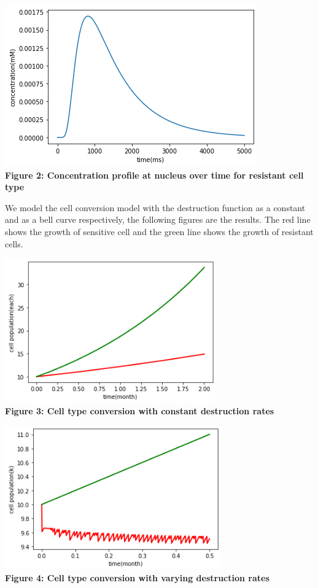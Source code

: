 \documentclass{edm_article}
\begin{document}
\includegraphics[scale = 0.6]{resistant.png}\\
\textbf{Figure 2: Concentration profile at nucleus over time for resistant cell type}

We model the cell conversion model with the destruction function as a constant and as a bell curve respectively, the following figures are the results. The red line shows the growth of sensitive cell and the green line shows the growth of resistant cells.

\includegraphics[scale = 0.6]{constant.png}\\
\textbf{Figure 3: Cell type conversion with constant destruction rates}

\includegraphics[scale = 0.6]{bell.png}\\
\textbf{Figure 4: Cell type conversion with varying destruction rates}
\end{document}
